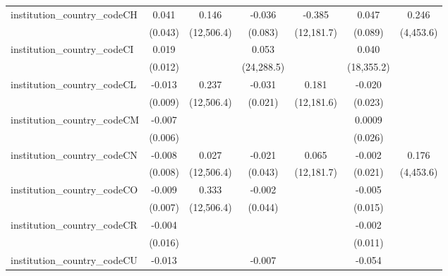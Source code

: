 \begin{tabular}{lcccccc}
   institution\_country\_codeCH          & 0.041          & 0.146         & -0.036        & -0.385        & 0.047         & 0.246\\   
                                         & (0.043)        & (12,506.4)    & (0.083)       & (12,181.7)    & (0.089)       & (4,453.6)\\   
   institution\_country\_codeCI          & 0.019          &               & 0.053         &               & 0.040         &   \\   
                                         & (0.012)        &               & (24,288.5)    &               & (18,355.2)    &   \\   
   institution\_country\_codeCL          & -0.013         & 0.237         & -0.031        & 0.181         & -0.020        &   \\   
                                         & (0.009)        & (12,506.4)    & (0.021)       & (12,181.6)    & (0.023)       &   \\   
   institution\_country\_codeCM          & -0.007         &               &               &               & 0.0009        &   \\   
                                         & (0.006)        &               &               &               & (0.026)       &   \\   
   institution\_country\_codeCN          & -0.008         & 0.027         & -0.021        & 0.065         & -0.002        & 0.176\\   
                                         & (0.008)        & (12,506.4)    & (0.043)       & (12,181.7)    & (0.021)       & (4,453.6)\\   
   institution\_country\_codeCO          & -0.009         & 0.333         & -0.002        &               & -0.005        &   \\   
                                         & (0.007)        & (12,506.4)    & (0.044)       &               & (0.015)       &   \\   
   institution\_country\_codeCR          & -0.004         &               &               &               & -0.002        &   \\   
                                         & (0.016)        &               &               &               & (0.011)       &   \\   
   institution\_country\_codeCU          & -0.013         &               & -0.007        &               & -0.054        &   \\   

\end{tabular}
